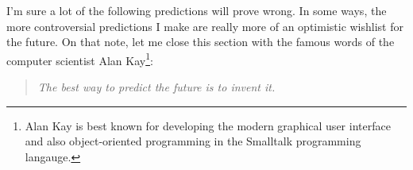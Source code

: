 I'm sure a lot of the following predictions will prove wrong. In some ways, the
more controversial predictions I make are really more of an optimistic wishlist
for the future. On that note, let me close this section with the famous words
of the computer scientist Alan Kay\footnote{Alan Kay is best known for
developing the modern graphical user interface and also object-oriented
programming in the Smalltalk programming langauge.}:
\begin{quote}
    \emph{The best way to predict the future is to invent it.}
\end{quote}
